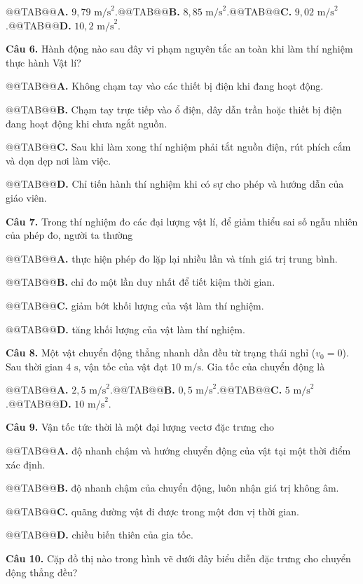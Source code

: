\documentclass{article}
\begin{document}
@@TAB@@\textbf{A.} $9{,}79\text{ m/s}^2$.@@TAB@@\textbf{B.} $8{,}85\text{ m/s}^2$.@@TAB@@\textbf{C.} $9{,}02\text{ m/s}^2$.@@TAB@@\textbf{D.} $10{,}2\text{ m/s}^2$.

\textbf{Câu 6.} Hành động nào sau đây vi phạm nguyên tắc an toàn khi làm thí nghiệm thực hành Vật lí?

@@TAB@@\textbf{A.} Không chạm tay vào các thiết bị điện khi đang hoạt động.

@@TAB@@\textbf{B.} Chạm tay trực tiếp vào ổ điện, dây dẫn trần hoặc thiết bị điện đang hoạt động khi chưa ngắt nguồn.

@@TAB@@\textbf{C.} Sau khi làm xong thí nghiệm phải tắt nguồn điện, rút phích cắm và dọn dẹp nơi làm việc.

@@TAB@@\textbf{D.} Chỉ tiến hành thí nghiệm khi có sự cho phép và hướng dẫn của giáo viên.

\textbf{Câu 7.} Trong thí nghiệm đo các đại lượng vật lí, để giảm thiểu sai số ngẫu nhiên của phép đo, người ta thường

@@TAB@@\textbf{A.} thực hiện phép đo lặp lại nhiều lần và tính giá trị trung bình.

@@TAB@@\textbf{B.} chỉ đo một lần duy nhất để tiết kiệm thời gian.

@@TAB@@\textbf{C.} giảm bớt khối lượng của vật làm thí nghiệm.

@@TAB@@\textbf{D.} tăng khối lượng của vật làm thí nghiệm.

\textbf{Câu 8.} Một vật chuyển động thẳng nhanh dần đều từ trạng thái nghỉ ($v_0 = 0$). Sau thời gian $4\text{ s}$, vận tốc của vật đạt $10\text{ m/s}$. Gia tốc của chuyển động là

@@TAB@@\textbf{A.} $2{,}5\text{ m/s}^2$.@@TAB@@\textbf{B.} $0{,}5\text{ m/s}^2$.@@TAB@@\textbf{C.} $5\text{ m/s}^2$.@@TAB@@\textbf{D.} $10\text{ m/s}^2$.

\textbf{Câu 9.} Vận tốc tức thời là một đại lượng vectơ đặc trưng cho

@@TAB@@\textbf{A.} độ nhanh chậm và hướng chuyển động của vật tại một thời điểm xác định.

@@TAB@@\textbf{B.} độ nhanh chậm của chuyển động, luôn nhận giá trị không âm.

@@TAB@@\textbf{C.} quãng đường vật đi được trong một đơn vị thời gian.

@@TAB@@\textbf{D.} chiều biến thiên của gia tốc.

\textbf{Câu 10.} Cặp đồ thị nào trong hình vẽ dưới đây biểu diễn đặc trưng cho chuyển động thẳng đều?
\end{document}
